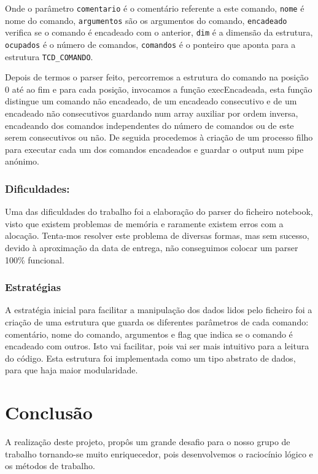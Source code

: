 \documentclass[4apaper]{report}
\begin{document}
Onde o parâmetro \texttt{comentario} é o comentário referente a este comando, \texttt{nome} é nome do comando, \texttt{argumentos} são os argumentos do comando, \texttt{encadeado} verifica se o comando é encadeado com o anterior, \texttt{dim} é a dimensão da estrutura, \texttt{ocupados} é o número de comandos, \texttt{comandos} é o ponteiro que aponta para a estrutura \texttt{TCD\_COMANDO}. 

Depois de termos o parser feito, percorremos a estrutura do comando na posição 0 até ao fim e para cada posição, invocamos a função execEncadeada, esta função distingue um comando não encadeado, de um encadeado consecutivo e de um encadeado não consecutivos guardando num array auxiliar por ordem inversa, encadeando dos comandos independentes do número de comandos ou de este serem consecutivos ou não. De seguida procedemos à criação de um processo filho para executar cada um dos comandos encadeados e guardar o output num pipe anónimo. 


\subsection{Dificuldades:}

Uma das dificuldades do trabalho foi a elaboração do parser do ficheiro notebook, visto que existem problemas de memória e raramente existem erros com a alocação. Tenta-mos resolver este problema de diversas formas, mas sem sucesso, devido à aproximação da data de entrega, não conseguimos colocar um parser 100\% funcional.

\subsection{Estratégias}

A estratégia inicial para facilitar a manipulação dos dados lidos pelo ficheiro foi a criação de uma estrutura que guarda os diferentes parâmetros de cada comando: comentário, nome do comando, argumentos e flag que indica se o comando é encadeado com outros. Isto vai facilitar, pois vai ser mais intuitivo para a leitura do código. Esta estrutura foi implementada como um tipo abstrato de dados, para que haja maior modularidade.

\newpage

\chapter{Conclusão}

A realização deste projeto, propôs um grande desafio para o nosso grupo de trabalho tornando-se muito enriquecedor, pois desenvolvemos o raciocínio lógico e os métodos de trabalho.
\end{document}

